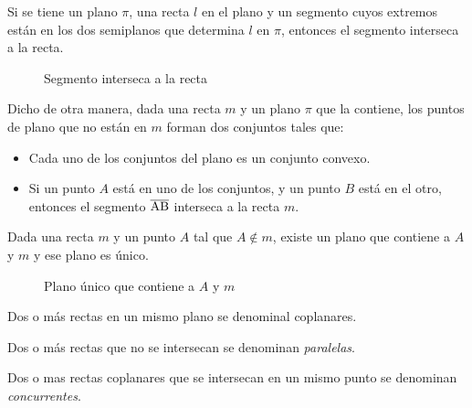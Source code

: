 \clearpage

\begin{postulate}
    Si se tiene un plano $\pi$, una recta $l$ en el plano y un segmento cuyos extremos están en los dos semiplanos que determina $l$ en $\pi$, entonces el segmento interseca a la recta.
    
    \begin{figure}[!h]
        \centering
        
        \caption{Segmento interseca a la recta}
        \label{fig:plot17}
    \end{figure}

    Dicho de otra manera, dada una recta $m$ y un plano $\pi$ que la contiene, los puntos de plano que no están en $m$ forman dos conjuntos tales que:

    \begin{itemize}
        \item Cada uno de los conjuntos del plano es un conjunto convexo.
        \item Si un punto $A$ está en uno de los conjuntos, y un punto $B$ está en el otro, entonces el segmento $\overline{\rm AB}$ interseca a la recta $m$.
    \end{itemize}
    
\end{postulate}

\begin{theorem}
    Dada una recta $m$ y un punto $A$ tal que $A \not \in m$, existe un plano que contiene a $A$ y $m$ y ese plano es único.
 
    \begin{figure}[!h]
        \centering
        
        \caption{Plano único que contiene a $A$ y $m$}
        \label{fig:theorem1}
    \end{figure}
        
\end{theorem}

\begin{definition}
Dos o más rectas en un mismo plano se denominal coplanares.
\end{definition}

\begin{definition}
Dos o más rectas que no se intersecan se denominan \textit{paralelas}.
\end{definition}

\begin{definition}
Dos o mas rectas coplanares que se intersecan en un mismo punto se denominan \textit{concurrentes}.
\end{definition}

